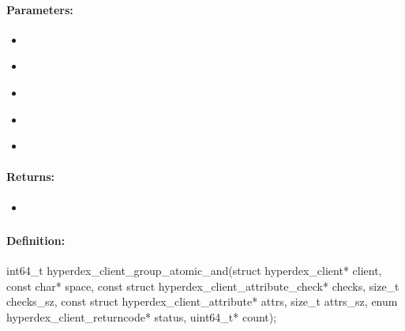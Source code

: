 \paragraph{Parameters:}
\begin{itemize}[noitemsep]
\item {}\\

\item {}\\

\item {}\\

\item {}\\

\item {}\\

\end{itemize}

\paragraph{Returns:}
\begin{itemize}[noitemsep]
\item {}\\

\end{itemize}

\pagebreak
\subsubsection{}
\label{api:c:group_atomic_and}


\paragraph{Definition:}
\begin{ccode}
int64_t hyperdex_client_group_atomic_and(struct hyperdex_client* client,
        const char* space,
        const struct hyperdex_client_attribute_check* checks, size_t checks_sz,
        const struct hyperdex_client_attribute* attrs, size_t attrs_sz,
        enum hyperdex_client_returncode* status,
        uint64_t* count);
\end{ccode}

